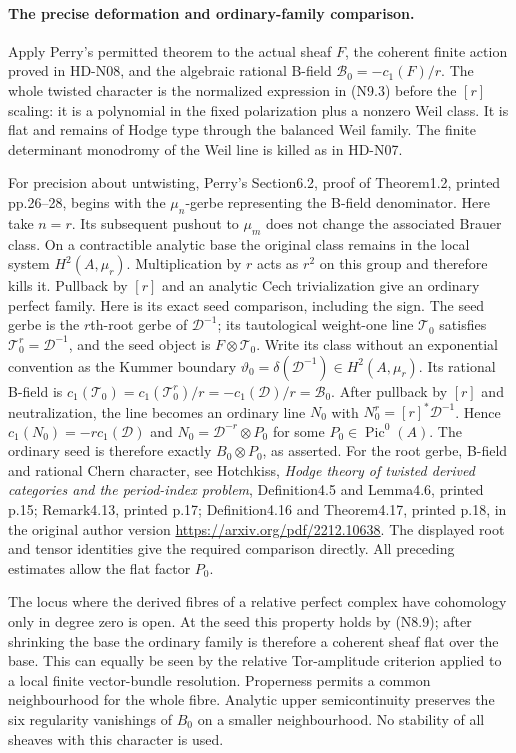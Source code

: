 \paragraph{The precise deformation and ordinary-family comparison.}
Apply Perry's permitted theorem to the actual sheaf $F$, the
coherent finite action proved in HD-N08, and the algebraic
rational B-field $\mathcal B_0=-c_1(F)/r$. The whole twisted
character is the normalized expression in (N9.3) before the
$[r]$ scaling: it is a polynomial in the fixed polarization
plus a nonzero Weil class. It is flat and remains of Hodge type
through the balanced Weil family. The finite determinant
monodromy of the Weil line is killed as in HD-N07.

For precision about untwisting, Perry's Section6.2, proof of Theorem1.2,
printed pp.26--28, begins with the $\mu_n$-gerbe representing
the B-field denominator. Here take $n=r$. Its subsequent pushout
to $\mu_m$ does not change the associated Brauer class. On a
contractible analytic base the original class remains in the
local system $H^2(A,\mu_r)$. Multiplication by $r$ acts as
$r^2$ on this group and therefore kills it. Pullback by $[r]$
and an analytic Cech trivialization give an ordinary perfect
family. Here is its exact seed comparison, including the sign.
The seed gerbe is the $r$th-root gerbe of $\mathcal D^{-1}$;
its tautological weight-one line $\mathcal T_0$ satisfies
$\mathcal T_0^r=\mathcal D^{-1}$, and the seed object is
$F\otimes\mathcal T_0$. Write its class without an exponential
convention as the Kummer boundary
$\vartheta_0=\delta(\mathcal D^{-1})\in H^2(A,\mu_r)$.
Its rational B-field is
$c_1(\mathcal T_0)=c_1(\mathcal T_0^r)/r
=-c_1(\mathcal D)/r=\mathcal B_0$.
After pullback by $[r]$ and neutralization, the line becomes
an ordinary line $N_0$ with
$N_0^r=[r]^*\mathcal D^{-1}$. Hence
$c_1(N_0)=-r c_1(\mathcal D)$ and
$N_0=\mathcal D^{-r}\otimes P_0$ for some
$P_0\in\operatorname{Pic}^0(A)$. The ordinary seed is therefore
exactly $B_0\otimes P_0$, as asserted.
For the root gerbe, B-field and rational Chern character, see
Hotchkiss, \emph{Hodge theory of twisted derived categories and
the period-index problem}, Definition4.5 and Lemma4.6,
printed p.15; Remark4.13, printed p.17; Definition4.16 and
Theorem4.17, printed p.18,
in the original author version
\url{https://arxiv.org/pdf/2212.10638}.
The displayed root and tensor identities give the required
comparison directly. All preceding estimates allow the flat
factor $P_0$.

The locus where the derived fibres of a relative perfect
complex have cohomology only in degree zero is open. At the
seed this property holds by (N8.9); after shrinking the base
the ordinary family is therefore a coherent sheaf flat over
the base. This can equally be seen by the relative Tor-amplitude
criterion applied to a local finite vector-bundle resolution.
Properness permits a common neighbourhood for the whole fibre.
Analytic upper semicontinuity preserves the six regularity
vanishings of $B_0$ on a smaller neighbourhood. No stability
of all sheaves with this character is used.

